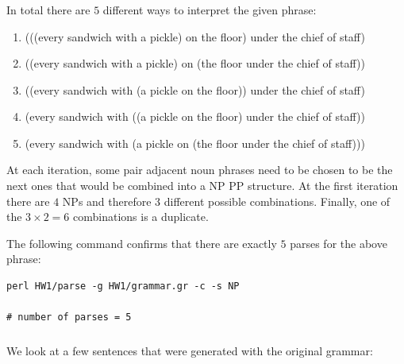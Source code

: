 \documentclass[11pt]{article}
\begin{document}
\subsubsection{}

In total there are $5$ different ways to interpret the given phrase:

\begin{enumerate}[label=\arabic*]
      \item (((every sandwich with a pickle) on the floor) under the chief of staff)
      \item ((every sandwich with a pickle) on (the floor under the chief of staff))
      \item ((every sandwich with (a pickle on the floor)) under the chief of staff)
      \item (every sandwich with ((a pickle on the floor) under the chief of staff))
      \item (every sandwich with (a pickle on (the floor under the chief of staff)))
\end{enumerate}

At each iteration, some pair adjacent noun phrases need to be chosen to be the next ones that would be combined into a NP PP structure. At the first iteration there are $4$ NPs and therefore $3$ different possible combinations. Finally, one of the $3 \times 2 = 6$ combinations is a duplicate.

The following command confirms that there are exactly $5$ parses for the above phrase:

\begin{verbatim}
perl HW1/parse -g HW1/grammar.gr -c -s NP

# number of parses = 5
\end{verbatim}

\subsubsection{}

We look at a few sentences that were generated with the original grammar:
\end{document}
